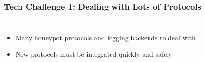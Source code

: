 \begin{frame}
\frametitle{Tech Challenge 1: Dealing with Lots of Protocols}


\begin{columns}[c]


\begin{itemize}
    \item Many honeypot protocols and logging backends to deal with
    \item New protocols must be integrated quickly and safely
\end{itemize}


\begin{figure}
\centering
{
\scalebox{0.65}{}
}
\end{figure}

\end{columns}

\end{frame}
